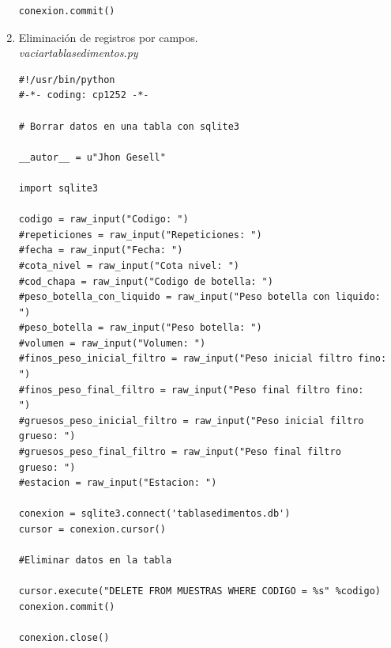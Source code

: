 \documentclass[a4paper,openright,12pt]{report}
\begin{document}
\begin{enumerate}
\begin{lstlisting}
conexion.commit()
\end{lstlisting}

\item Eliminaci\'on de registros por campos. \\
\textit{vaciartablasedimentos.py}
\begin{lstlisting}
#!/usr/bin/python
#-*- coding: cp1252 -*-

# Borrar datos en una tabla con sqlite3

__autor__ = u"Jhon Gesell"

import sqlite3

codigo = raw_input("Codigo: ")
#repeticiones = raw_input("Repeticiones: ")
#fecha = raw_input("Fecha: ")
#cota_nivel = raw_input("Cota nivel: ")
#cod_chapa = raw_input("Codigo de botella: ")
#peso_botella_con_liquido = raw_input("Peso botella con liquido:
")
#peso_botella = raw_input("Peso botella: ")
#volumen = raw_input("Volumen: ")
#finos_peso_inicial_filtro = raw_input("Peso inicial filtro fino:
")
#finos_peso_final_filtro = raw_input("Peso final filtro fino:
")
#gruesos_peso_inicial_filtro = raw_input("Peso inicial filtro
grueso: ")
#gruesos_peso_final_filtro = raw_input("Peso final filtro
grueso: ")
#estacion = raw_input("Estacion: ")

conexion = sqlite3.connect('tablasedimentos.db')
cursor = conexion.cursor()

#Eliminar datos en la tabla

cursor.execute("DELETE FROM MUESTRAS WHERE CODIGO = %s" %codigo)
conexion.commit()

conexion.close()
\end{lstlisting}


\end{enumerate}
\end{document}
